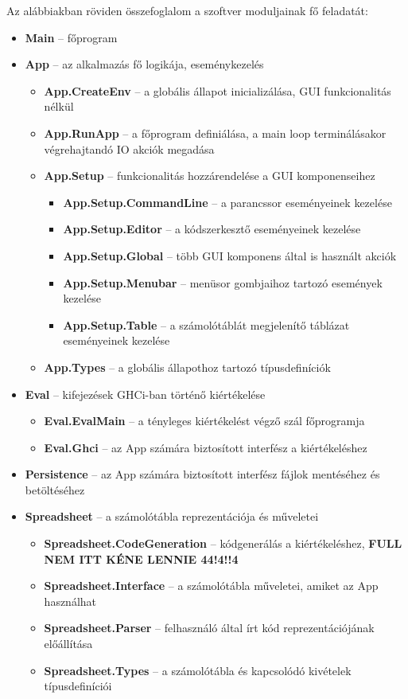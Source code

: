 Az alábbiakban röviden összefoglalom a szoftver moduljainak fő feladatát:

\begin{itemize}
	\item \textbf{Main} -- főprogram
	\item \textbf{App} -- az alkalmazás fő logikája, eseménykezelés
	\begin{itemize}
		\item \textbf{App.CreateEnv} -- a globális állapot inicializálása, GUI funkcionalitás nélkül
		\item \textbf{App.RunApp} -- a főprogram definiálása, a main loop terminálásakor végrehajtandó IO akciók megadása
		\item \textbf{App.Setup}	-- funkcionalitás hozzárendelése a GUI komponenseihez
		\begin{itemize}
			\item \textbf{App.Setup.CommandLine} -- a parancssor eseményeinek kezelése
			\item \textbf{App.Setup.Editor} -- a kódszerkesztő eseményeinek kezelése
			\item \textbf{App.Setup.Global} -- több GUI komponens által is használt akciók
			\item \textbf{App.Setup.Menubar} -- menüsor gombjaihoz tartozó események kezelése
			\item \textbf{App.Setup.Table} -- a számolótáblát megjelenítő táblázat eseményeinek kezelése
		\end{itemize}
		\item \textbf{App.Types} -- a globális állapothoz tartozó típusdefiníciók
	\end{itemize}
	\item \textbf{Eval} -- kifejezések GHCi-ban történő kiértékelése
	\begin{itemize}
		\item \textbf{Eval.EvalMain} -- a tényleges kiértékelést végző szál főprogramja
		\item \textbf{Eval.Ghci} -- az App számára biztosított interfész a kiértékeléshez
	\end{itemize}
	\item \textbf{Persistence} -- az App számára biztosított interfész fájlok mentéséhez és betöltéséhez
	\item \textbf{Spreadsheet} -- a számolótábla reprezentációja és műveletei
	\begin{itemize}
		\item \textbf{Spreadsheet.CodeGeneration} -- kódgenerálás a kiértékeléshez, \textbf{FULL NEM ITT KÉNE LENNIE 44!4!!4}
		\item \textbf{Spreadsheet.Interface} -- a számolótábla műveletei, amiket az App használhat
		\item \textbf{Spreadsheet.Parser} -- felhasználó által írt kód reprezentációjának előállítása
		\item \textbf{Spreadsheet.Types} -- a számolótábla és kapcsolódó kivételek típusdefiníciói
	\end{itemize}
\end{itemize} 

